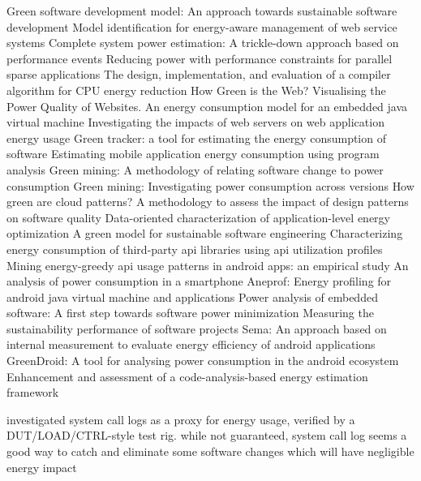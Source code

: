 \citep{Shenoy2011} Green software development model: An approach towards sustainable software development
\citep{Tanelli2008} Model identification for energy-aware management of web service systems
\citep{Bircher2007} Complete system power estimation: A trickle-down approach based on performance events
\citep{Chen2005b} Reducing power with performance constraints for parallel sparse applications
\citep{Hsu2003} The design, implementation, and evaluation of a compiler algorithm for CPU energy reduction
\citep{Naumann2008a} How Green is the Web? Visualising the Power Quality of Websites.
\citep{Lafond2006} An energy consumption model for an embedded java virtual machine
\citep{Manotas2013} Investigating the impacts of web servers on web application energy usage
\citep{Amsel2010} Green tracker: a tool for estimating the energy consumption of software
\citep{Hao2013} Estimating mobile application energy consumption using program analysis
\citep{Hindle2012} Green mining: A methodology of relating software change to power consumption
\citep{Hindle2012a} Green mining: Investigating power consumption across versions
\citep{Abtahizadeh2015} How green are cloud patterns?
\citep{Ampatzoglou2012} A methodology to assess the impact of design patterns on software quality
\citep{Liu2015} Data-oriented characterization of application-level energy optimization
\citep{Mahmoud2013a} A green model for sustainable software engineering
\citep{Schuler2020} Characterizing energy consumption of third-party api libraries using api utilization profiles
\citep{Linares-Vasquez2014} Mining energy-greedy api usage patterns in android apps: an empirical study
\citep{Carroll2010} An analysis of power consumption in a smartphone
\citep{Chung2011} Aneprof: Energy profiling for android java virtual machine and applications
\citep{Tiwari1994} Power analysis of embedded software: A first step towards software power minimization
\citep{Albertao2010} Measuring the sustainability performance of software projects
\citep{Fischer2015} Sema: An approach based on internal measurement to evaluate energy efficiency of android applications
\citep{Couto2015} GreenDroid: A tool for analysing power consumption in the android ecosystem
\citep{Ahmad2018} Enhancement and assessment of a code-analysis-based energy estimation framework

\citep{Aggarwal2015} investigated system call logs as a proxy for energy usage, verified by a DUT/LOAD/CTRL-style test rig. while not guaranteed, system call log seems a good way to catch and eliminate some software changes which will have negligible energy impact

